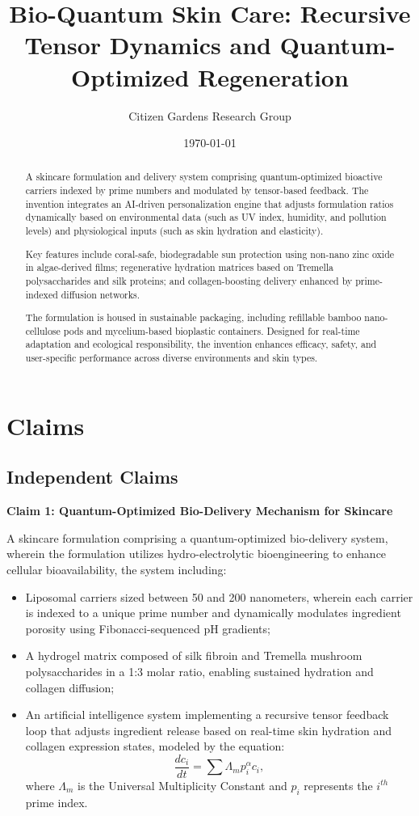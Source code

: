 \documentclass{article}
\title{Bio-Quantum Skin Care: Recursive Tensor Dynamics and Quantum-Optimized Regeneration}
\author{Citizen Gardens Research Group}
\date{\today}
\theoremstyle{plain}
\theoremstyle{claimstyle}
\begin{document}
\maketitle

\begin{abstract}

A skincare formulation and delivery system comprising quantum-optimized bioactive carriers indexed by prime numbers and modulated by tensor-based feedback. The invention integrates an AI-driven personalization engine that adjusts formulation ratios dynamically based on environmental data (such as UV index, humidity, and pollution levels) and physiological inputs (such as skin hydration and elasticity). 

Key features include coral-safe, biodegradable sun protection using non-nano zinc oxide in algae-derived films; regenerative hydration matrices based on Tremella polysaccharides and silk proteins; and collagen-boosting delivery enhanced by prime-indexed diffusion networks. 

The formulation is housed in sustainable packaging, including refillable bamboo nano-cellulose pods and mycelium-based bioplastic containers. Designed for real-time adaptation and ecological responsibility, the invention enhances efficacy, safety, and user-specific performance across diverse environments and skin types.
\end{abstract}

\section{Claims}

\subsection*{Independent Claims}

\textbf{Claim 1: Quantum-Optimized Bio-Delivery Mechanism for Skincare}  

A skincare formulation comprising a quantum-optimized bio-delivery system, wherein the formulation utilizes hydro-electrolytic bioengineering to enhance cellular bioavailability, the system including:  
\begin{itemize}
    \item Liposomal carriers sized between 50 and 200 nanometers, wherein each carrier is indexed to a unique prime number and dynamically modulates ingredient porosity using Fibonacci-sequenced pH gradients;
    \item A hydrogel matrix composed of silk fibroin and Tremella mushroom polysaccharides in a 1:3 molar ratio, enabling sustained hydration and collagen diffusion;
    \item An artificial intelligence system implementing a recursive tensor feedback loop that adjusts ingredient release based on real-time skin hydration and collagen expression states, modeled by the equation:
    \[
    \frac{dc_i}{dt} = \sum \Lambda_m p_i^\alpha c_i,
    \]
    where \( \Lambda_m \) is the Universal Multiplicity Constant and \( p_i \) represents the \( i^{th} \) prime index.
\end{itemize}
\end{document}
